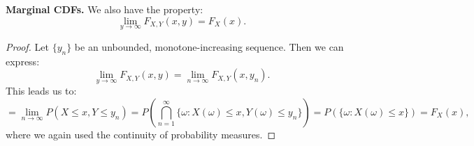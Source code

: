 \begin{lemma}
    \textbf{Marginal CDFs.} We also have the property:
    \[
    \lim_{y \to \infty} F_{X,Y}(x,y) = F_X(x).
    \]
\end{lemma}

\begin{proof}
    Let \( \{y_n\} \) be an unbounded, monotone-increasing sequence. Then we can express:
   \[
   \lim_{y \to \infty} F_{X,Y}(x,y) = \lim_{n \to \infty} F_{X,Y}(x,y_n).
   \]
   This leads us to:
   \[
   = \lim_{n \to \infty} P(X \leq x, Y \leq y_n) = P\left(\bigcap_{n=1}^{\infty} \{\omega : X(\omega) \leq x, Y(\omega) \leq y_n\}\right) = P(\{\omega : X(\omega) \leq x\}) = F_X(x),
   \]
   where we again used the continuity of probability measures.
\end{proof}

